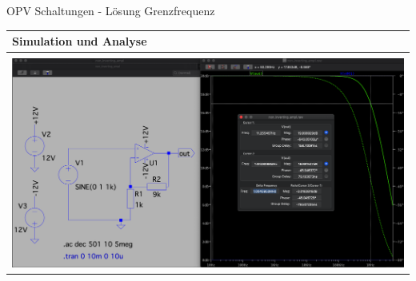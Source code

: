           \begin{frame}[t]{OPV Schaltungen - Lösung Grenzfrequenz} 
    
              \begin{spacing}{0.9} \begin{tiny}
                \begin{table}[h!]
                \begin{tabular}{p{10cm}}
                  \hline
                  \textbf{Simulation und Analyse} \\
                  \hline \\
                  \begin{minipage}{\textwidth}
                    \includegraphics[width=\linewidth]{pictures/bode_2.png}
                  \end{minipage} 
                  \\
                \end{tabular}
      
              \end{table}
               
              \end{tiny} \end{spacing}

          \end{frame}